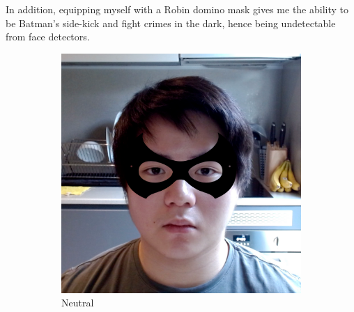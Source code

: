 \documentclass[10pt,twocolumn,letterpaper]{article}
\begin{document}
In addition, equipping myself with a Robin domino mask gives me the ability to be Batman's side-kick and fight crimes in the dark, hence being undetectable from face detectors.

\begin{figure}[t]
    \centering
    \begin{subfigure}[b]{.49\linewidth}
        \centering
        \includegraphics[width=\linewidth]{Figures/eyes_1.png}
        \caption{Neutral}
    \end{subfigure}
    \hfill
    \begin{subfigure}[b]{.49\linewidth}
        \centering

\end{subfigure}
\end{figure}
\end{document}
